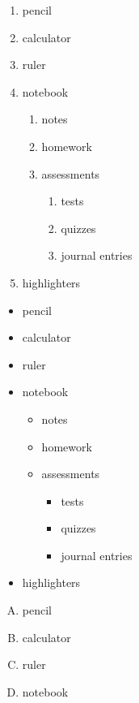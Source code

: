 \documentclass[11pt]{article}
\begin{document}
\begin{enumerate}
    \item pencil
    \item calculator
    \item ruler
    \item notebook
          \begin{enumerate}
              \item notes
              \item homework
              \item assessments
                    \begin{enumerate}
                        \item tests
                        \item quizzes
                        \item journal entries
                    \end{enumerate}
          \end{enumerate}
    \item highlighters
\end{enumerate}

\vspace{1cm}

\begin{itemize}
    \item pencil
    \item calculator
    \item ruler
    \item notebook
          \begin{itemize}
              \item notes
              \item homework
              \item assessments
                    \begin{itemize}
                        \item tests
                        \item quizzes
                        \item journal entries
                    \end{itemize}
          \end{itemize}
    \item highlighters
\end{itemize}

\pagebreak

\begin{enumerate}[A.]
    \item pencil
    \item calculator
    \item ruler
    \item notebook
\end{enumerate}
\end{document}
